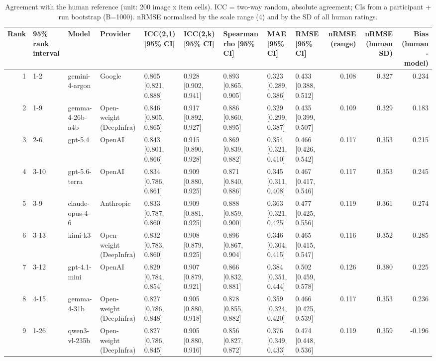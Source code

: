 \begin{table}
\caption{Agreement with the human reference (unit: 200 image x item cells). ICC = two-way random, absolute agreement; CIs from a participant + run bootstrap (B=1000). nRMSE normalised by the scale range (4) and by the SD of all human ratings.}
\begin{tabular}{rllllllllrrr}
\toprule
Rank & 95\% rank interval & Model & Provider & ICC(2,1) [95\% CI] & ICC(2,k) [95\% CI] & Spearman rho [95\% CI] & MAE [95\% CI] & RMSE [95\% CI] & nRMSE (range) & nRMSE (human SD) & Bias (human - model) \\
\midrule
1 & 1-2 & gemini-4-argon & Google & 0.865 [0.821, 0.888] & 0.928 [0.902, 0.941] & 0.893 [0.865, 0.905] & 0.323 [0.289, 0.386] & 0.433 [0.388, 0.512] & 0.108 & 0.327 & 0.234 \\
2 & 1-9 & gemma-4-26b-a4b & Open-weight (DeepInfra) & 0.846 [0.805, 0.865] & 0.917 [0.892, 0.927] & 0.886 [0.860, 0.895] & 0.329 [0.299, 0.387] & 0.435 [0.399, 0.507] & 0.109 & 0.329 & 0.183 \\
3 & 2-6 & gpt-5.4 & OpenAI & 0.843 [0.801, 0.866] & 0.915 [0.890, 0.928] & 0.869 [0.839, 0.882] & 0.354 [0.321, 0.410] & 0.466 [0.426, 0.542] & 0.117 & 0.353 & 0.215 \\
4 & 3-10 & gpt-5.6-terra & OpenAI & 0.834 [0.786, 0.861] & 0.909 [0.880, 0.925] & 0.871 [0.840, 0.886] & 0.345 [0.311, 0.408] & 0.467 [0.417, 0.546] & 0.117 & 0.353 & 0.245 \\
5 & 3-9 & claude-opus-4-6 & Anthropic & 0.833 [0.787, 0.860] & 0.909 [0.881, 0.925] & 0.888 [0.859, 0.900] & 0.363 [0.321, 0.425] & 0.477 [0.425, 0.556] & 0.119 & 0.361 & 0.274 \\
6 & 3-13 & kimi-k3 & Open-weight (DeepInfra) & 0.832 [0.783, 0.860] & 0.908 [0.879, 0.925] & 0.896 [0.867, 0.904] & 0.346 [0.304, 0.415] & 0.465 [0.415, 0.547] & 0.116 & 0.352 & 0.285 \\
7 & 3-12 & gpt-4.1-mini & OpenAI & 0.829 [0.784, 0.854] & 0.907 [0.879, 0.921] & 0.866 [0.832, 0.881] & 0.384 [0.351, 0.444] & 0.502 [0.459, 0.578] & 0.126 & 0.380 & 0.225 \\
8 & 4-15 & gemma-4-31b & Open-weight (DeepInfra) & 0.827 [0.786, 0.848] & 0.905 [0.880, 0.918] & 0.878 [0.855, 0.882] & 0.359 [0.324, 0.420] & 0.466 [0.425, 0.539] & 0.117 & 0.353 & 0.236 \\
9 & 1-26 & qwen3-vl-235b & Open-weight (DeepInfra) & 0.827 [0.786, 0.845] & 0.905 [0.880, 0.916] & 0.856 [0.827, 0.872] & 0.376 [0.349, 0.433] & 0.474 [0.448, 0.536] & 0.119 & 0.359 & -0.196 \\

\end{tabular}
\end{table}

